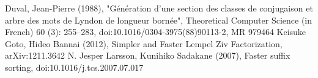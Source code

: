 \begin{thebibliography}{9}

 Duval, Jean-Pierre (1988), "Génération d'une section des classes de conjugaison et arbre des mots de Lyndon de longueur bornée", Theoretical Computer Science (in French) 60 (3): 255--283, doi:10.1016/0304-3975(88)90113-2, MR 979464
 Keisuke Goto, Hideo Bannai (2012), Simpler and Faster Lempel Ziv Factorization, arXiv:1211.3642
 N. Jesper Larsson, Kunihiko Sadakane (2007), Faster suffix sorting, doi:10.1016/j.tcs.2007.07.017

\end{thebibliography}
